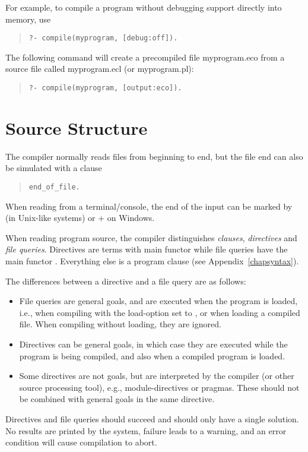 For example, to compile a program without debugging support directly into
memory, use
\begin{quote}\begin{verbatim}
?- compile(myprogram, [debug:off]).
\end{verbatim}
\end{quote}
The following command will create a precompiled file myprogram.eco from a
source file called myprogram.ecl (or myprogram.pl):
\begin{quote}\begin{verbatim}
?- compile(myprogram, [output:eco]).
\end{verbatim}
\end{quote}


\section{Source Structure}

The compiler normally reads files from beginning to end, but the
file end can also be simulated with a clause
\begin{quote}
\begin{verbatim}
end_of_file.
\end{verbatim}
\end{quote}
When reading from a terminal/console, the end of the input can be
marked by  (in Unix-like systems) or
+ on Windows.

When reading program source, the compiler distinguishes
{\it clauses}, {\it directives} and {\it file queries}.
Directives are terms with main functor
while file queries have the main functor
.  Everything else is a program clause
(see Appendix~\ref{chapsyntax}).

The differences between a directive and a file query are as follows:
\begin{itemize}
\item File queries are general goals, and are executed when the program
	is loaded, i.e., when compiling with the load-option set to
        ,
	or when loading a compiled file.  When compiling without loading,
	they are ignored.
\item Directives can be general goals, in which case they are executed
	while the program is being compiled, and also when a compiled
	program is loaded.
\item Some directives are not goals, but are interpreted by the compiler
	(or other source processing tool), e.g., module-directives or
	pragmas.  These should not be combined with general goals in
	the same directive.
\end{itemize}
Directives and file queries should succeed and should only have a single
solution. No results are printed by the system, failure leads to a warning,
and an error condition will cause compilation to abort.

